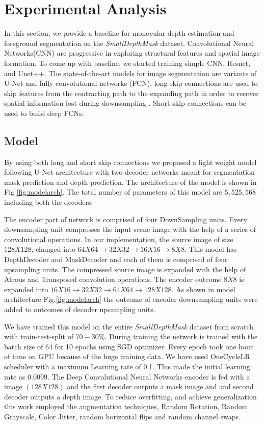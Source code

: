 \documentclass[review]{cvpr}
\begin{document}
\section{Experimental Analysis}
In this section, we provide a baseline for monocular depth estimation and foreground segmentation on the \textit{SmallDepthMask} dataset.
Convolutional Neural Networks(CNN) are progressive in exploring structural features and spatial image formation. 
To come up with baseline, we started  training simple CNN, Resnet, and Unet++. 
The state-of-the-art models for image segmentation are variants of U-Net and fully convolutional networks (FCN)\cite{drozdzal2016importance}. 
long skip connections are used to skip features from the contracting path to the expanding path in order to recover 
spatial information lost during downsampling \cite{zhou2019unet++}. Short skip connections can be used to build deep FCNs. 

\subsection{Model}
By using both long and short skip connections we proposed a light weight model following U-Net architecture with two decoder 
networks meant for segmentation mask prediction and depth prediction. The architecture of the model is shown in Fig \ref{fig:modelarch}. 
The total number of parameters of this model are $5,525,568$ including both the decoders. 

The encoder part of network is comprised of four DownSampling units. Every downsampling unit compresses the input scene image with the help of a series of convolutional operations. In our implementation, the source image of size $128 X 128$, changed into $64X64 \rightarrow 32X32 \rightarrow  16X16 \rightarrow 8X8$. This model has DepthDecoder and MaskDecoder and each of them is comprised of four upsampling units. The compressed source image is expanded with the help of Atrous and Transposed convolution operations. The encoder outcome $8 X 8$ is expanded into $16X16 \rightarrow 32X32 \rightarrow 64X64 \rightarrow 128X128$. As shown in model architecture Fig.\ref{fig:modelarch} the outcome of encoder downsampling units were added to outcomes of decoder upsampling units.

We have trained this model on the entire \textit{SmallDepthMask} dataset from scratch with train-test-split of $70-30\%$. 
During training the network is trained with the batch size of 64 for 10 epochs using SGD optimizer\cite{bottou2010large}. Every epoch took one hour of time on GPU because of the huge training data.
We have used OneCycleLR scheduler \cite{smith2018disciplined} with a maximum Learning rate of 0.1. 
This made the initial learning rate as 0.0099.
The Deep Convolutional Neural Networks encoder is fed with a image $(128 X 128)$ and the first decoder outputs a mask 
image and and second decoder outputs a depth image. To reduce overfitting\cite{perez2017effectiveness}, and achieve generalization
this work employed the augmentation techniques, Random Rotation, Random Grayscale, Color Jitter, random horizontal flips and random channel swaps. 
\end{document}
